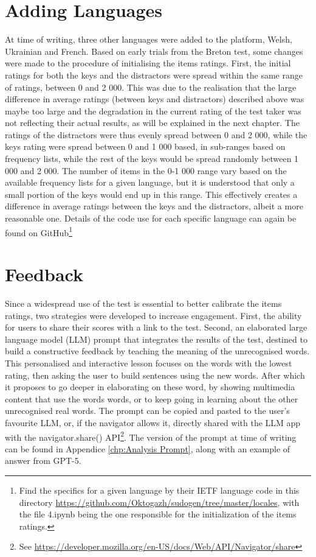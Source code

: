     \section{Adding Languages}
At time of writing, three other languages were added to the platform, Welsh, Ukrainian and French. Based on early trials from the Breton test, some changes were made to the procedure of initialising the items ratings. First, the initial ratings for both the keys and the distractors were spread within the same range of ratings, between 0 and 2 000. This was due to the realisation that the large difference in average ratings (between keys and distractors) described above was maybe too large and the degradation in the current rating of the test taker was not reflecting their actual results, as will be explained in the next chapter. The ratings of the distractors were thus evenly spread between 0 and 2 000, while the keys rating were spread between 0 and 1 000 based, in sub-ranges based on frequency lists, while the rest of the keys would be spread randomly between 1 000 and 2 000. The number of items in the 0-1 000 range vary based on the available frequency lists for a given language, but it is understood that only a small portion of the keys would end up in this range. This effectively creates a difference in average ratings between the keys and the distractors, albeit a more reasonable one. Details of the code use for each specific language can again be found on GitHub\footnote{Find the specifics for a given language by their IETF language code in this directory \url{https://github.com/Oktogazh/sudogen/tree/master/locales}, with the file 4.ipynb being the one responsible for the initialization of the items ratings.}

    \section{Feedback}
Since a widespread use of the test is essential to better calibrate the items ratings, two strategies were developed to increase engagement. First, the ability for users to share their scores with a link to the test. Second, an elaborated large language model (LLM) prompt that integrates the results of the test, destined to build a constructive feedback by teaching the meaning of the unrecognised words. This personalised and interactive lesson focuses on the words with the lowest rating, then asking the user to build sentences using the new words. After which it proposes to go deeper in elaborating on these word, by showing multimedia content that use the words words, or to keep going in learning about the other unrecognised real words. The prompt can be copied and pasted to the user's favourite LLM, or, if the navigator allows it, directly shared with the LLM app with the navigator.share() API\footnote{See \url{https://developer.mozilla.org/en-US/docs/Web/API/Navigator/share}}. The version of the prompt at time of writing can be found in Appendice \ref{chp:Analysis Prompt}, along with an example of answer from GPT-5.

